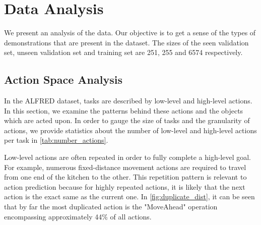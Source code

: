 \documentclass[11pt,a4paper]{article}
\begin{document}
\begin{table}[]
    \centering
    \caption{Statistics on the number of low-level and high-level actions for the splits of the data.}
    \label{tab:number_actions}
\end{table}

\section{Data Analysis}
We present an analysis of the data. Our objective is to get a sense of the types of demonstrations that are present in the dataset. The sizes of the seen validation set, unseen validation set and training set are 251, 255 and 6574 respectively.

\subsection{Action Space Analysis}

In the ALFRED dataset, tasks are described by low-level and high-level actions. In this section, we examine the patterns behind these actions and the objects which are acted upon. In order to gauge the size of tasks and the granularity of actions, we provide statistics about the number of low-level and high-level actions per task in
\autoref{tab:number_actions}.

Low-level actions are often repeated in order to fully complete a high-level goal. For example, numerous fixed-distance movement actions are required to travel from one end of the kitchen to the other. This repetition pattern is relevant to action prediction because for highly repeated actions, it is likely that the next action is the exact same as the current one. In \autoref{fig:duplicate_dist}, it can be seen that by far the most duplicated action is the "MoveAhead" operation encompassing approximately 44\% of all actions.
\end{document}
